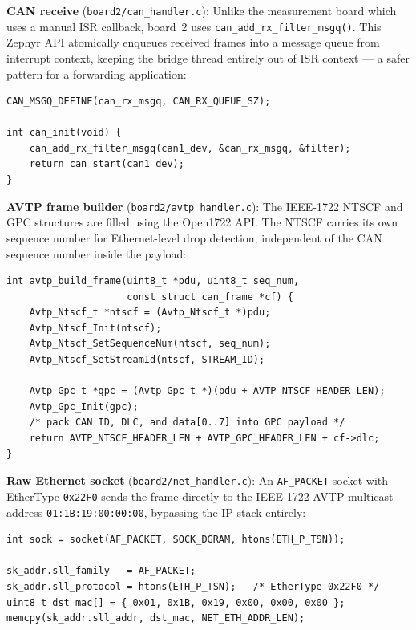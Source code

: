 \documentclass[11pt,a4paper]{article}
\begin{document}
\textbf{CAN receive} (\texttt{board2/can\_handler.c}): Unlike the measurement board
which uses a manual ISR callback, board~2 uses \texttt{can\_add\_rx\_filter\_msgq()}.
This Zephyr API atomically enqueues received frames into a message queue from interrupt
context, keeping the bridge thread entirely out of ISR context --- a safer pattern for
a forwarding application:

\begin{lstlisting}[style=cstyle, caption={board2/can\_handler.c --- message-queue receive filter}]
CAN_MSGQ_DEFINE(can_rx_msgq, CAN_RX_QUEUE_SZ);

int can_init(void) {
    can_add_rx_filter_msgq(can1_dev, &can_rx_msgq, &filter);
    return can_start(can1_dev);
}
\end{lstlisting}

\textbf{AVTP frame builder} (\texttt{board2/avtp\_handler.c}): The IEEE-1722 NTSCF
and GPC structures are filled using the Open1722 API.  The NTSCF carries its own
sequence number for Ethernet-level drop detection, independent of the CAN sequence
number inside the payload:

\begin{lstlisting}[style=cstyle, caption={board2/avtp\_handler.c --- NTSCF/GPC frame construction}]
int avtp_build_frame(uint8_t *pdu, uint8_t seq_num,
                     const struct can_frame *cf) {
    Avtp_Ntscf_t *ntscf = (Avtp_Ntscf_t *)pdu;
    Avtp_Ntscf_Init(ntscf);
    Avtp_Ntscf_SetSequenceNum(ntscf, seq_num);
    Avtp_Ntscf_SetStreamId(ntscf, STREAM_ID);

    Avtp_Gpc_t *gpc = (Avtp_Gpc_t *)(pdu + AVTP_NTSCF_HEADER_LEN);
    Avtp_Gpc_Init(gpc);
    /* pack CAN ID, DLC, and data[0..7] into GPC payload */
    return AVTP_NTSCF_HEADER_LEN + AVTP_GPC_HEADER_LEN + cf->dlc;
}
\end{lstlisting}

\textbf{Raw Ethernet socket} (\texttt{board2/net\_handler.c}): An \texttt{AF\_PACKET}
socket with EtherType \texttt{0x22F0} sends the frame directly to the IEEE-1722 AVTP
multicast address \texttt{01:1B:19:00:00:00}, bypassing the IP stack entirely:

\begin{lstlisting}[style=cstyle, caption={board2/net\_handler.c --- raw Ethernet socket setup}]
int sock = socket(AF_PACKET, SOCK_DGRAM, htons(ETH_P_TSN));

sk_addr.sll_family   = AF_PACKET;
sk_addr.sll_protocol = htons(ETH_P_TSN);   /* EtherType 0x22F0 */
uint8_t dst_mac[] = { 0x01, 0x1B, 0x19, 0x00, 0x00, 0x00 };
memcpy(sk_addr.sll_addr, dst_mac, NET_ETH_ADDR_LEN);
\end{lstlisting}
\end{document}
